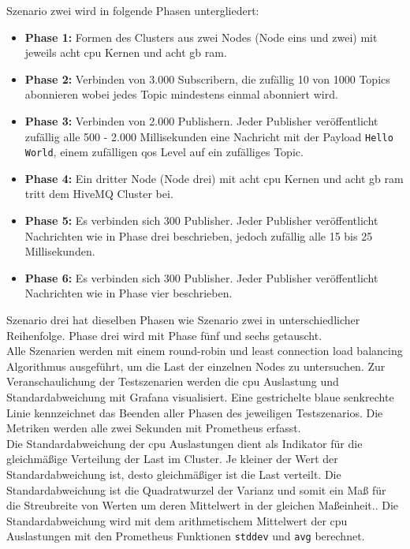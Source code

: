 Szenario zwei wird in folgende Phasen untergliedert:
\begin{itemize}
  \item \textbf{Phase 1:} Formen des Clusters aus zwei Nodes (Node eins und zwei) mit jeweils acht \ac{cpu} Kernen und acht \ac{gb} \ac{ram}.
  \item \textbf{Phase 2:} Verbinden von 3.000 Subscribern, die zufällig 10 von 1000 Topics abonnieren wobei jedes Topic mindestens einmal abonniert wird.
  \item \textbf{Phase 3:} Verbinden von 2.000 Publishern. Jeder Publisher veröffentlicht zufällig alle 500 - 2.000 Millisekunden eine Nachricht mit der Payload \verb|Hello World|, einem zufälligen \ac{qos} Level auf ein zufälliges Topic.
  \item \textbf{Phase 4:} Ein dritter Node (Node drei) mit acht \ac{cpu} Kernen und acht \ac{gb} \ac{ram} tritt dem HiveMQ Cluster bei.
  \item \textbf{Phase 5:} Es verbinden sich 300 Publisher. Jeder Publisher veröffentlicht Nachrichten wie in Phase drei beschrieben, jedoch zufällig alle 15 bis 25 Millisekunden.
  \item \textbf{Phase 6:} Es verbinden sich 300 Publisher. Jeder Publisher veröffentlicht Nachrichten wie in Phase vier beschrieben.
\end{itemize}
Szenario drei hat dieselben Phasen wie Szenario zwei in unterschiedlicher Reihenfolge. Phase drei wird mit Phase fünf und sechs getauscht.
\\
Alle Szenarien werden mit einem round-robin und least connection load balancing Algorithmus ausgeführt, um die Last der einzelnen Nodes zu untersuchen.
Zur Veranschaulichung der Testszenarien werden die \ac{cpu} Auslastung und Standardabweichung mit Grafana visualisiert. Eine gestrichelte blaue senkrechte Linie kennzeichnet das Beenden aller Phasen des jeweiligen Testszenarios. Die Metriken werden alle zwei Sekunden mit Prometheus erfasst.
\\
Die Standardabweichung der \ac{cpu} Auslastungen dient als Indikator für die gleichmä{\ss}ige Verteilung der Last im Cluster. Je kleiner der Wert der Standardabweichung ist, desto gleichmä{\ss}iger ist die Last verteilt.
Die Standardabweichung ist die Quadratwurzel der Varianz und somit ein Ma{\ss} für die Streubreite von Werten um deren Mittelwert in der gleichen Ma{\ss}einheit.\cite[S.~72]{buchterElementareStochastikEinfuhrung2005}. Die Standardabweichung wird mit dem arithmetischem Mittelwert der \ac{cpu} Auslastungen mit den Prometheus Funktionen \verb|stddev| und \verb|avg| berechnet.


